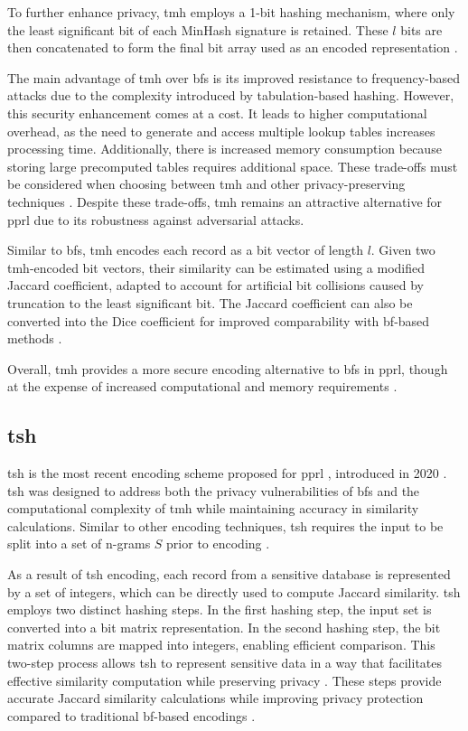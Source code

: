 To further enhance privacy, \ac{tmh} employs a 1-bit hashing mechanism, where only the least significant bit of each MinHash signature is retained.
These $l$ bits are then concatenated to form the final bit array used as an encoded representation \cite{schaefer2024}.

The main advantage of \ac{tmh} over \ac{bf}s is its improved resistance to frequency-based attacks due to the complexity introduced by tabulation-based hashing.
However, this security enhancement comes at a cost.
It leads to higher computational overhead, as the need to generate and access multiple lookup tables increases processing time.
Additionally, there is increased memory consumption because storing large precomputed tables requires additional space.
These trade-offs must be considered when choosing between \ac{tmh} and other privacy-preserving techniques \cite{schaefer2024,vidanage2020graph}.
Despite these trade-offs, \ac{tmh} remains an attractive alternative for \ac{pprl} due to its robustness against adversarial attacks.

Similar to \ac{bf}s, \ac{tmh} encodes each record as a bit vector of length $l$.
Given two \ac{tmh}-encoded bit vectors, their similarity can be estimated using a modified Jaccard coefficient, adapted to account for artificial bit collisions caused by truncation to the least significant bit.
The Jaccard coefficient can also be converted into the Dice coefficient for improved comparability with \ac{bf}-based methods \cite{vidanage2020graph,schaefer2024}.

Overall, \ac{tmh} provides a more secure encoding alternative to \ac{bf}s in \ac{pprl}, though at the expense of increased computational and memory requirements \cite{schaefer2024, vidanage2020graph}.


\subsection{\ac{tsh}} \label{sec:tsh}

\ac{tsh} is the most recent encoding scheme proposed for \ac{pprl} , introduced in 2020 \cite{ranbaduge2020secure}.
\ac{tsh} was designed to address both the privacy vulnerabilities of \ac{bf}s and the computational complexity of \ac{tmh} while maintaining accuracy in similarity calculations.
Similar to other encoding techniques, \ac{tsh} requires the input to be split into a set of n-grams $S$ prior to encoding \cite{ranbaduge2020secure}.

As a result of \ac{tsh} encoding, each record from a sensitive database is represented by a set of integers, which can be directly used to compute Jaccard similarity.
\ac{tsh} employs two distinct hashing steps.
In the first hashing step, the input set is converted into a bit matrix representation.
In the second hashing step, the bit matrix columns are mapped into integers, enabling efficient comparison.
This two-step process allows \ac{tsh} to represent sensitive data in a way that facilitates effective similarity computation while preserving privacy \cite{schaefer2024}.
These steps provide accurate Jaccard similarity calculations while improving privacy protection compared to traditional \ac{bf}-based encodings \cite{ranbaduge2020secure}.

